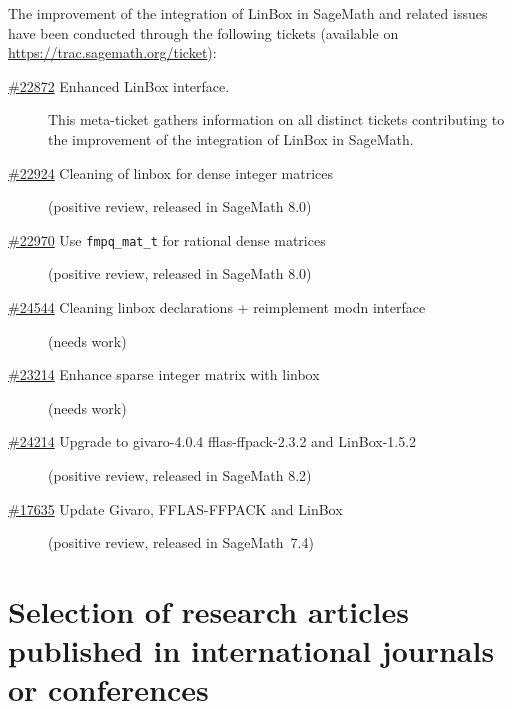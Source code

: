 \documentclass{deliverablereport}
\begin{document}
The improvement of the integration of LinBox in SageMath and related issues have
been conducted through the following tickets (available on \url{https://trac.sagemath.org/ticket}):
{\small
  \begin{description}
\item[\href{https://trac.sagemath.org/ticket/22872}{\#22872}
  Enhanced LinBox interface.]
  This meta-ticket gathers information on all distinct tickets contributing to
  the improvement of the integration of LinBox in SageMath. 
\item[\href{https://trac.sagemath.org/ticket/22924}{\#22924}
  Cleaning of linbox for dense integer matrices] (positive review, released in SageMath 8.0)
\item[\href{https://trac.sagemath.org/ticket/22970}{\#22970}
  Use \texttt{fmpq\_mat\_t} for rational dense matrices]
  (positive review, released in SageMath 8.0)
\item[\href{https://trac.sagemath.org/ticket/24544}{\#24544}
  Cleaning linbox declarations + reimplement modn interface]
  (needs work)
\item[\href{https://trac.sagemath.org/ticket/23214}{\#23214}
  Enhance sparse integer matrix with linbox]
  (needs work)
\item[\href{https://trac.sagemath.org/ticket/24214}{\#24214}
  Upgrade to givaro-4.0.4 fflas-ffpack-2.3.2 and LinBox-1.5.2]
  (positive review, released in SageMath 8.2)
\item[\href{https://trac.sagemath.org/ticket/17635}{\#17635}
  	Update Givaro, FFLAS-FFPACK and LinBox]
  (positive review, released in Sage\-Math~7.4)
\end{description}
}




\appendix
\section{Selection of research articles published in international journals or conferences}
\label{app:papers}



\end{document}
